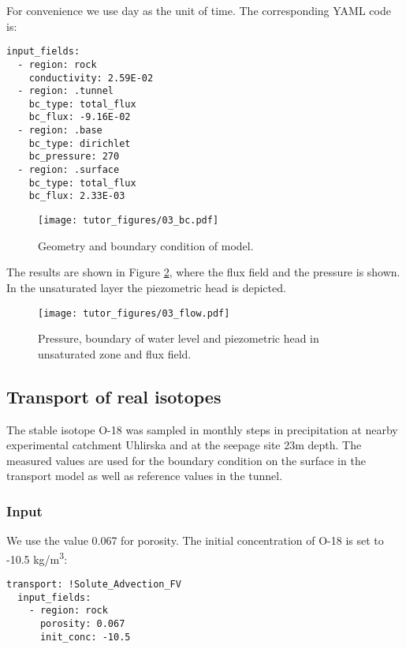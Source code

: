 For convenience we use day as the unit of time. The corresponding YAML
code is:

\begin{verbatim}
input_fields:
  - region: rock
    conductivity: 2.59E-02
  - region: .tunnel
    bc_type: total_flux
    bc_flux: -9.16E-02
  - region: .base
    bc_type: dirichlet
    bc_pressure: 270
  - region: .surface
    bc_type: total_flux
    bc_flux: 2.33E-03
\end{verbatim}

\begin{figure}[htbp]
\centering
\texttt{[image: tutor\_figures/03\_bc.pdf]}
\caption{Geometry and boundary condition of model.\label{fig:geom}}
\end{figure}

The results are shown in Figure \ref{fig:flow}, where the flux field and
the pressure is shown. In the unsaturated layer the piezometric head is
depicted.

\begin{figure}[htbp]
\centering
\texttt{[image: tutor\_figures/03\_flow.pdf]}
\caption{Pressure, boundary of water level and piezometric head in
unsaturated zone and flux field.\label{fig:flow}}
\end{figure}

\subsection{Transport of real
isotopes}\label{transport-of-real-isotopes}

The stable isotope O-18 was sampled in monthly steps in precipitation at
nearby experimental catchment Uhlirska and at the seepage site 23m
depth. The measured values are used for the boundary condition on the
surface in the transport model as well as reference values in the
tunnel.

\subsubsection{Input}\label{input}

We use the value 0.067 for porosity. The initial concentration of O-18
is set to -10.5 kg/m\textsuperscript{3}:

\begin{verbatim}
transport: !Solute_Advection_FV
  input_fields:
    - region: rock
      porosity: 0.067
      init_conc: -10.5
\end{verbatim}

